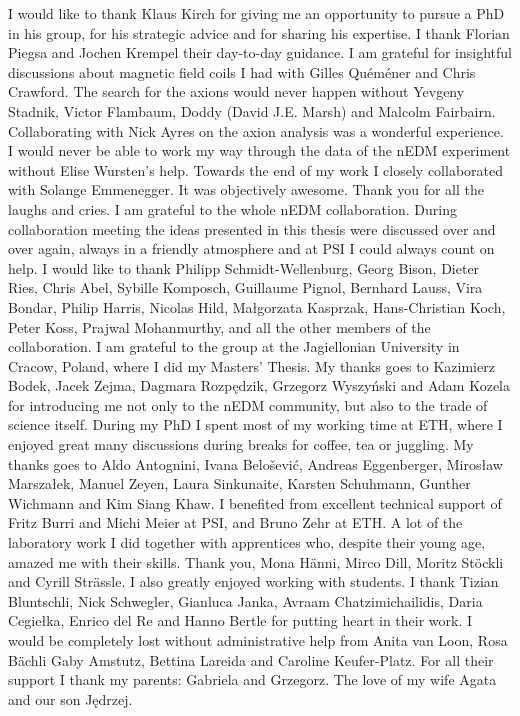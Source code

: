 I would like to thank Klaus Kirch for giving me an opportunity to pursue a PhD in his group, for his strategic advice and for sharing his expertise.
I thank Florian Piegsa and Jochen Krempel their day-to-day guidance.
I am grateful for insightful discussions about magnetic field coils I had with Gilles Quéméner and Chris Crawford.
The search for the axions would never happen without Yevgeny Stadnik, Victor Flambaum, Doddy (David J.E.
Marsh) and Malcolm Fairbairn.
Collaborating with Nick Ayres on the axion analysis was a wonderful experience.
I would never be able to work my way through the data of the nEDM experiment without Elise Wursten's help.
Towards the end of my work I closely collaborated with Solange Emmenegger.
It was objectively awesome.
Thank you for all the laughs and cries.
I am grateful to the whole nEDM collaboration.
During collaboration meeting the ideas presented in this thesis were discussed over and over again, always in a friendly atmosphere and at PSI I could always count on help.
I would like to thank
Philipp Schmidt-Wellenburg,
Georg Bison,
Dieter Ries,
Chris Abel,
Sybille Komposch,
Guillaume Pignol,
Bernhard Lauss,
Vira Bondar,
Philip Harris,
Nicolas Hild,
Małgorzata Kasprzak,
Hans-Christian Koch,
Peter Koss,
Prajwal Mohanmurthy,
and all the other members of the collaboration.
I am grateful to the group at the Jagiellonian University in Cracow, Poland, where I did my Masters' Thesis.
My thanks goes to
Kazimierz Bodek,
Jacek Zejma,
Dagmara Rozpędzik,
Grzegorz Wyszyński and
Adam Kozela
for introducing me not only to the nEDM community, but also to the trade of science itself.
During my PhD I spent most of my working time at ETH, where I enjoyed great many discussions during breaks for coffee, tea or juggling.
My thanks goes to
Aldo Antognini,
Ivana Belo\v{s}ević,
Andreas Eggenberger,
Mirosław Marszałek,
Manuel Zeyen,
Laura Sinkunaite,
Karsten Schuhmann,
Gunther Wichmann and
Kim Siang Khaw.
I benefited from excellent technical support of Fritz Burri and Michi Meier at PSI, and Bruno Zehr at ETH\@.
A lot of the laboratory work I did together with apprentices who, despite their young age, amazed me with their skills.
Thank you,
Mona Hänni,
Mirco Dill,
Moritz Stöckli and
Cyrill Strässle.
I also greatly enjoyed working with students.
I thank
Tizian Bluntschli,
Nick Schwegler,
Gianluca Janka,
Avraam Chatzimichailidis,
Daria Cegiełka,
Enrico del Re and
Hanno Bertle for putting heart in their work.
I would be completely lost without administrative help from Anita van Loon, Rosa Bächli
Gaby Amstutz, Bettina Lareida and Caroline Keufer-Platz.
For all their support I thank my parents: Gabriela and Grzegorz.
The love of my wife Agata and our son Jędrzej.

